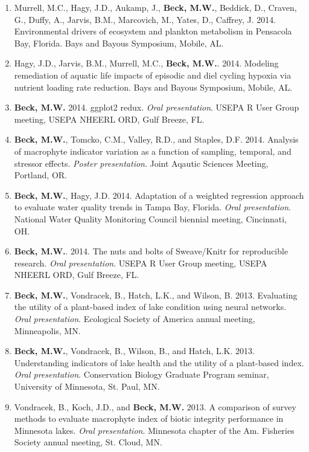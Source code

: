 \documentclass[letterpaper,12pt]{article}
\begin{document}
\begin{enumerate}
\item Murrell, M.C., Hagy, J.D., Aukamp, J., {\bf Beck, M.W.}, Beddick, D., Craven, G., Duffy, A., Jarvis, B.M., Marcovich, M., Yates, D., Caffrey, J. 2014. Environmental drivers of ecosystem and plankton metabolism in Pensacola Bay, Florida. Bays and Bayous Symposium, Mobile, AL. 

\item Hagy, J.D., Jarvis, B.M., Murrell, M.C., {\bf Beck, M.W.}. 2014. Modeling remediation of aquatic life impacts of episodic and diel cycling hypoxia via nutrient loading rate reduction. Bays and Bayous Symposium, Mobile, AL. 

\item {\bf Beck, M.W.} 2014. ggplot2 redux. \textit{Oral presentation}. USEPA R User Group meeting, USEPA NHEERL ORD, Gulf Breeze, FL.

\item {\bf Beck, M.W.}, Tomcko, C.M., Valley, R.D., and Staples, D.F. 2014. Analysis of macrophyte indicator variation as a function of sampling, temporal, and stressor effects. \textit{Poster presentation}. Joint Aqautic Sciences Meeting, Portland, OR.

\item {\bf Beck, M.W.}, Hagy, J.D. 2014. Adaptation of a weighted regression approach to evaluate water quality trends in {T}ampa {B}ay, {F}lorida. \textit{Oral presentation}. National Water Quality Monitoring Council biennial meeting, Cincinnati, OH.

\item {\bf Beck, M.W.}. 2014. The nuts and bolts of Sweave/Knitr for reproducible research. \textit{Oral presentation}. USEPA R User Group meeting, USEPA NHEERL ORD, Gulf Breeze, FL.

\item {\bf Beck, M.W.}, Vondracek, B., Hatch, L.K., and Wilson, B. 2013. Evaluating the utility of a plant-based index of lake condition using neural networks. \textit{Oral presentation}. Ecological Society of America annual meeting, Minneapolis, MN.

\item {\bf Beck, M.W.}, Vondracek, B., Wilson, B., and Hatch, L.K. 2013. Understanding indicators of lake health and the utility of a plant-based index. \textit{Oral presentation}. Conservation Biology Graduate Program seminar, University of Minnesota, St. Paul, MN.

\item Vondracek, B., Koch, J.D., and {\bf Beck, M.W.} 2013. A comparison of survey methods to evaluate macrophyte index of biotic integrity performance in Minnesota lakes. \textit{Oral presentation}. Minnesota chapter of the Am. Fisheries Society annual meeting, St. Cloud, MN.


\end{enumerate}
\end{document}
